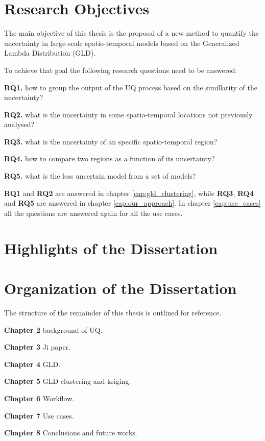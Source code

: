 \section{Research Objectives}

\begin{tcolorbox}
The main objective of this thesis is the proposal of a new method to quantify the uncertainty in large-scale spatio-temporal models based on the Generalized Lambda Distribution (GLD).
\end{tcolorbox}

To achieve that goal the following research questions need to be answered:

\textbf{RQ1.} how to group the output of the UQ process based on the simillarity of the uncertainty?

\textbf{RQ2.} what is the uncertainty in some spatio-temporal locations not previously analysed?

\textbf{RQ3.} what is the uncertainty of an specific spatio-temporal region?

\textbf{RQ4.} how to compare two regions as a function of its uncertainty?

\textbf{RQ5.} what is the less uncertain model from a set of models?

\textbf{RQ1} and \textbf{RQ2} are answered in chapter \ref{cap:gld_clustering}, while \textbf{RQ3}, \textbf{RQ4} and \textbf{RQ5} are answered in chapter \ref{cap:our_approach}. In chapter \ref{cap:use_cases} all the questions are answered again for all the use cases.

\section{Highlights of the Dissertation}

\section{Organization of the Dissertation}

The structure of the remainder of this thesis is outlined for reference.

\textbf{Chapter 2} background of UQ.

\textbf{Chapter 3} Ji paper.

\textbf{Chapter 4} GLD.

\textbf{Chapter 5} GLD clustering and kriging.

\textbf{Chapter 6} Workflow.

\textbf{Chapter 7} Use cases.

\textbf{Chapter 8} Conclusions and future works.
